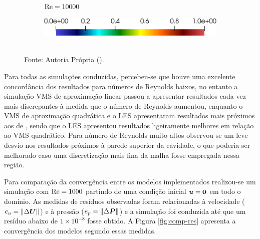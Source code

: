 \begin{figure}[h!]
\begin{subfigure}{0.32\textwidth}
        \caption{$\mathrm{Re}=10000$}
    \end{subfigure}
    \begin{subfigure}{0.4\textwidth}
        \includegraphics[width=\linewidth]{Figuras/Cavity/Legenda.png}
    \end{subfigure}
    \\Fonte: Autoria Própria (\the\year).
    \label{fig:cavity-results2}
\end{figure}

Para todas as simulações conduzidas, percebeu-se que houve uma excelente concordância dos resultados para números de Reynolds baixos, no entanto a simulação VMS de aproximação linear passou a apresentar resultados cada vez mais discrepantes à medida que o número de Reynolds aumentou, enquanto o VMS de aproximação quadrática e o LES apresentaram resultados mais próximos aos de , sendo que o LES apresentou resultados ligeiramente melhores em relação ao VMS quadrático. Para número de Reynolds muito altos observou-se um leve desvio nos resultados próximos à parede superior da cavidade, o que poderia ser melhorado caso uma discretização mais fina da malha fosse empregada nessa região.

Para comparação da convergência entre os modelos implementados realizou-se um simulação com $\mathrm{Re}=1000$ partindo de uma condição inicial $\boldsymbol{u}=\boldsymbol{0}$ em todo o domínio. As medidas de resíduos observadas foram relacionadas à velocidade ($e_u=\left\lVert{\Delta\boldsymbol{U}}\right\lVert$) e à pressão ($e_p=\left\lVert{\Delta\boldsymbol{P}}\right\lVert$) e a simulação foi conduzida até que um resíduo abaixo de $1\times10^{-8}$ fosse obtido. A Figura \ref{fig:comp-res} apresenta a convergência dos modelos segundo essas medidas.

